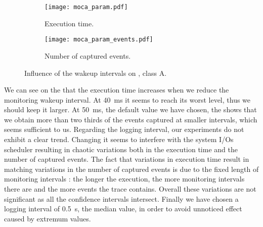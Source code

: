 \begin{figure}[htb]
    \centering
    \begin{subfigure}{.9\linewidth}
        \texttt{[image: moca\_param.pdf]}
        \caption{Execution time.}
        \label{fig:param_time}
    \end{subfigure}
    \begin{subfigure}{.9\linewidth}
        \texttt{[image: moca\_param\_events.pdf]}
        \caption{Number of captured events.}
        \label{fig:param_evts}
    \end{subfigure}
    \caption{Influence of the wakeup intervals on \IS, class A.}
    \label{fig:param}
\end{figure}

We can see on the  that the execution time increases when we
reduce the monitoring wakeup interval. At \SI{40}{ms}
it seems to reach its worst level, thus we should keep it larger. At \SI{50}{ms}, the default value we have chosen, the
 shows that we obtain more than two thirds of the events captured
at smaller intervals, which seems sufficient to us.
Regarding the logging interval, our experiments do not exhibit a clear trend. Changing it seems to interfere with the system I/Os scheduler resulting in chaotic
variations both in the execution time and the number of captured events. The fact that variations in execution time result in matching variations in the number
of captured events is due to the fixed length of monitoring intervals : the longer the execution, the more monitoring intervals there are and the more events
the trace contains. Overall these variations are not significant as all the confidence intervals intersect. 
Finally we have chosen a logging interval of \SI{0.5}{s}, the median value, in order to avoid unnoticed effect caused by extremum values.


